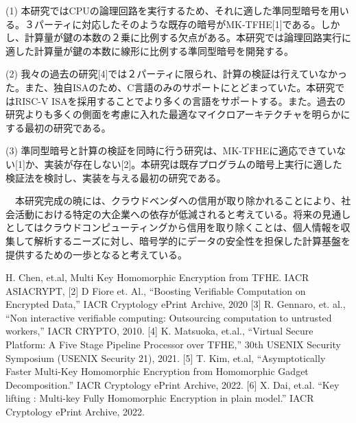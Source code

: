 
\noindent(1)	本研究ではCPUの論理回路を実行するため、それに適した準同型暗号を用いる。３パーティに対応したそのような既存の暗号がMK-TFHE[1]である。しかし、計算量が鍵の本数の２乗に比例する欠点がある。本研究では論理回路実行に適した計算量が鍵の本数に線形に比例する準同型暗号を開発する。

\noindent(2)	我々の過去の研究[4]では２パーティに限られ、計算の検証は行えていなかった。また、独自ISAのため、C言語のみのサポートにとどまっていた。本研究ではRISC-V ISAを採用することでより多くの言語をサポートする。また。過去の研究よりも多くの側面を考慮に入れた最適なマイクロアーキテクチャを明らかにする最初の研究である。

\noindent(3)	準同型暗号と計算の検証を同時に行う研究は、MK-TFHEに適応できていない[1]か、実装が存在しない[2]。本研究は既存プログラムの暗号上実行に適した検証法を検討し、実装を与える最初の研究である。


　本研究完成の暁には、クラウドベンダへの信用が取り除かれることにより、社会活動における特定の大企業への依存が低減されると考えている。将来の見通しとしてはクラウドコンピューティングから信用を取り除くことは、個人情報を収集して解析するニーズに対し、暗号学的にデータの安全性を担保した計算基盤を提供するための一歩となると考えている。

 H. Chen, et.al, Multi Key Homomorphic Encryption from TFHE. IACR ASIACRYPT, [2] D Fiore et. Al., “Boosting Verifiable Computation on Encrypted Data,” IACR Cryptology ePrint
Archive, 2020 [3] R. Gennaro, et. al., “Non interactive verifiable computing: Outsourcing
computation to untrusted workers,” IACR CRYPTO, 2010. [4] K. Matsuoka, et.al., “Virtual Secure
Platform: A Five Stage Pipeline Processor over TFHE,” 30th USENIX Security Symposium (USENIX Security 21), 2021.
[5] T. Kim, et.al, “Asymptotically Faster Multi-Key Homomorphic Encryption from Homomorphic Gadget Decomposition.” IACR Cryptology ePrint Archive, 2022. [6] X. Dai, et.al. “Key lifting : Multi-key Fully Homomorphic Encryption in plain model.” IACR Cryptology ePrint Archive, 2022.



